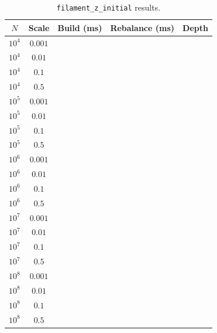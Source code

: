 \begin{table}[ht]
    \centering
    \caption{\texttt{filament\_z\_initial} results.}
    \label{tab:filament_z_results}
    \begin{tabular}{|c|c|c|c|c|}
        \hline
        \textbf{$N$} & \textbf{Scale} & \textbf{Build (ms)} & \textbf{Rebalance (ms)} & \textbf{Depth} \\
        \hline
        $10^4$ & $0.001$ & & & \\
        $10^4$ & $0.01$  & & & \\
        $10^4$ & $0.1$   & & & \\
        $10^4$ & $0.5$   & & & \\
        \hline
        $10^5$ & $0.001$ & & & \\
        $10^5$ & $0.01$  & & & \\
        $10^5$ & $0.1$   & & & \\
        $10^5$ & $0.5$   & & & \\
        \hline
        $10^6$ & $0.001$ & & & \\
        $10^6$ & $0.01$  & & & \\
        $10^6$ & $0.1$   & & & \\
        $10^6$ & $0.5$   & & & \\
        \hline
        $10^7$ & $0.001$ & & & \\
        $10^7$ & $0.01$  & & & \\
        $10^7$ & $0.1$   & & & \\
        $10^7$ & $0.5$   & & & \\
        \hline
        $10^8$ & $0.001$ & & & \\
        $10^8$ & $0.01$  & & & \\
        $10^8$ & $0.1$   & & & \\
        $10^8$ & $0.5$   & & & \\
        \hline
    \end{tabular}
\end{table}

